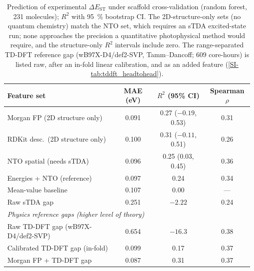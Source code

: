 \begin{table}[htbp]
  \centering
  \caption{Prediction of experimental $\Delta E_\text{ST}$ under scaffold
    cross-validation (random forest, \num{231} molecules); $R^2$ with \qty{95}{\percent}
    bootstrap CI. The 2D-structure-only sets (no quantum chemistry) match the
    NTO set, which requires an sTDA excited-state run; none approaches the
    precision a quantitative photophysical method would require, and the
    structure-only $R^2$ intervals include zero. The range-separated TD-DFT
    reference gap (wB97X-D4/def2-SVP, Tamm--Dancoff; \num{609} core-hours) is
    listed raw, after an in-fold linear calibration, and as an added feature
    (\cref{SI-tab:tddft_headtohead}).}
  \label{tab:feature_comparison}
  \begin{tabular}{lccc}
    \toprule
    Feature set & MAE (eV) & $R^2$ (95\% CI) & Spearman $\rho$ \\
    \midrule
    Morgan FP (2D structure only)   & 0.091 & 0.27 ($-0.19$, 0.53) & 0.31 \\
    RDKit desc.\ (2D structure only) & 0.100 & 0.31 ($-0.11$, 0.51) & 0.26 \\
    NTO spatial (needs sTDA)        & 0.096 & 0.25 (0.03, 0.45) & 0.36 \\
    Energies + NTO (reference)      & 0.097 & 0.24 & 0.34 \\
    \midrule
    Mean-value baseline             & 0.107 & 0.00 & --- \\
    Raw sTDA gap                    & 0.251 & $-2.22$ & 0.24 \\
    \midrule
    \multicolumn{4}{l}{\emph{Physics reference gaps (higher level of theory)}} \\
    Raw TD-DFT gap (wB97X-D4/def2-SVP) & 0.654 & $-16.3$ & 0.38 \\
    Calibrated TD-DFT gap (in-fold)    & 0.099 & 0.17 & 0.37 \\
    Morgan FP $+$ TD-DFT gap           & 0.087 & 0.31 & 0.37 \\
    \bottomrule
  \end{tabular}
\end{table}

